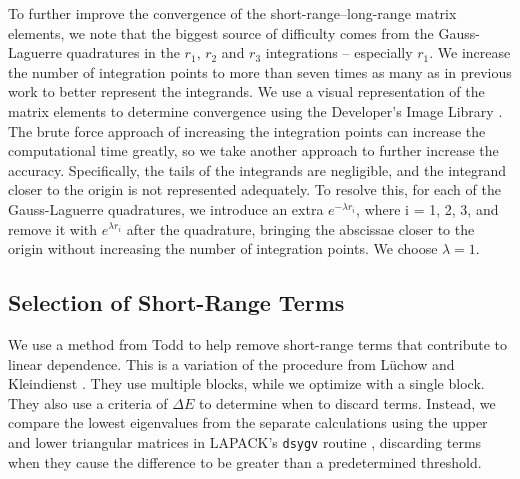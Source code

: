 \documentclass[preprint,showpacs,showkeys,preprintnumbers,amsmath,amssymb,longbibliography,pra,aps]{revtex4-1}
\begin{document}
To further improve the convergence of the short-range--long-range matrix 
elements, we note that the biggest source of difficulty
comes from the Gauss-Laguerre quadratures in the $r_1$, $r_2$ and $r_3$ 
integrations -- especially $r_1$. We increase the number of integration 
points to more than seven times as many as in previous work
\cite{VanReeth2003,VanReeth2004} to better represent the integrands. We use
a visual representation of the matrix elements to determine convergence using
the Developer's Image Library \cite{DevIL}. The brute force approach
of increasing the integration points
can increase the computational time greatly, so we take another approach to 
further increase the accuracy. Specifically, the tails of the integrands are 
negligible, and the integrand closer to the origin is not represented 
adequately. To resolve this, for each of the Gauss-Laguerre quadratures, we 
introduce an extra $e^{-\lambda r_i}$, where i = 1, 2, 3,
and remove it with $e^{\lambda r_i}$ 
after the quadrature, bringing the abscissae closer to the origin without 
increasing the number of integration points. We choose $\lambda = 1$.

\subsection{Selection of Short-Range Terms}
\label{sec:Truncation}
We use a method from Todd \cite{Todd2007} to help remove short-range terms that
contribute to linear dependence. This is a variation of the procedure from
L\"uchow and Kleindienst \cite{Luchow1992}. They use multiple blocks, while we 
optimize with a single block. They also use a criteria of $\Delta E$ to 
determine when to discard terms. Instead, we compare the lowest eigenvalues 
from the separate calculations using the upper and lower triangular matrices 
in LAPACK's \texttt{dsygv} routine \cite{LAPACK}, discarding terms when they 
cause the difference to be greater than a predetermined threshold.
\end{document}
